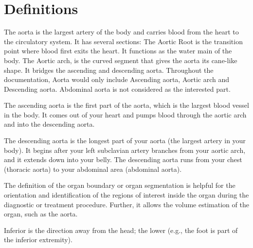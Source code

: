 

\section*{Definitions}
\begin{description}[font=\rmfamily\bfseries, leftmargin=3cm, style=nextline]
	\item[Aorta] The aorta is the largest artery of the body and carries blood from the heart to the circulatory system. It has several sections: The Aortic Root is the transition point where blood first exits the heart. It functions as the water main of the body. The Aortic arch, is the curved segment that gives the aorta its cane-like shape. It bridges the ascending and descending aorta. Throughout the documentation, Aorta would only include Ascending aorta, Aortic arch and Descending aorta. Abdominal aorta is not considered as the interested part.
	\item[Ascending Aorta] The ascending aorta is the first part of the aorta, which is the largest blood vessel in the body. It comes out of your heart and pumps blood through the aortic arch and into the descending aorta.
	\item[Descending Aorta] The descending aorta is the longest part of your aorta (the largest artery in your body). It begins after your left subclavian artery branches from your aortic arch, and it extends down into your belly. The descending aorta runs from your chest (thoracic aorta) to your abdominal area (abdominal aorta).
	\item[Organ Segmentation] The definition of the organ boundary or organ segmentation is helpful for the orientation and identification of the regions of interest inside the organ during the diagnostic or treatment procedure. Further, it allows the volume estimation of the organ, such as the aorta.
	\item[Inferior] Inferior is the direction away from the head; the lower (e.g., the foot is part of the inferior extremity).

\end{description}
